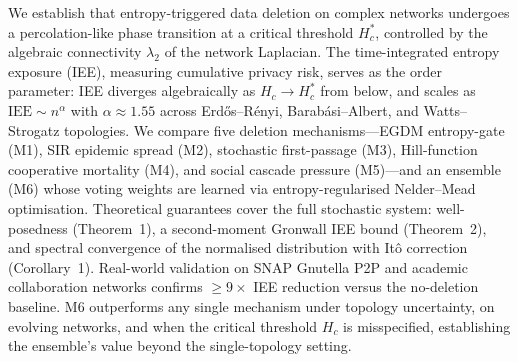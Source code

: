 
We establish that entropy-triggered data deletion on complex networks undergoes
a percolation-like phase transition at a critical threshold $H_c^*$, controlled
by the algebraic connectivity $\lambda_2$ of the network Laplacian.
The time-integrated entropy exposure (IEE), measuring cumulative privacy risk,
serves as the order parameter: IEE diverges algebraically as $H_c \to H_c^*$
from below, and scales as $\mathrm{IEE} \sim n^{\alpha}$ with $\alpha \approx
1.55$ across Erd\H{o}s--R\'enyi, Barab\'asi--Albert, and Watts--Strogatz
topologies.
We compare five deletion mechanisms---EGDM entropy-gate (M1), SIR epidemic
spread (M2), stochastic first-passage (M3), Hill-function cooperative mortality
(M4), and social cascade pressure (M5)---and an ensemble (M6) whose voting
weights are learned via entropy-regularised Nelder--Mead optimisation.
Theoretical guarantees cover the full stochastic system: well-posedness (Theorem~1),
a second-moment Gronwall IEE bound (Theorem~2), and spectral convergence of
the normalised distribution with It\^{o} correction (Corollary~1).
Real-world validation on SNAP Gnutella P2P and academic collaboration networks
confirms $\geq 9\times$ IEE reduction versus the no-deletion baseline.
M6 outperforms any single mechanism under topology uncertainty, on evolving
networks, and when the critical threshold $H_c$ is misspecified, establishing
the ensemble's value beyond the single-topology setting.
